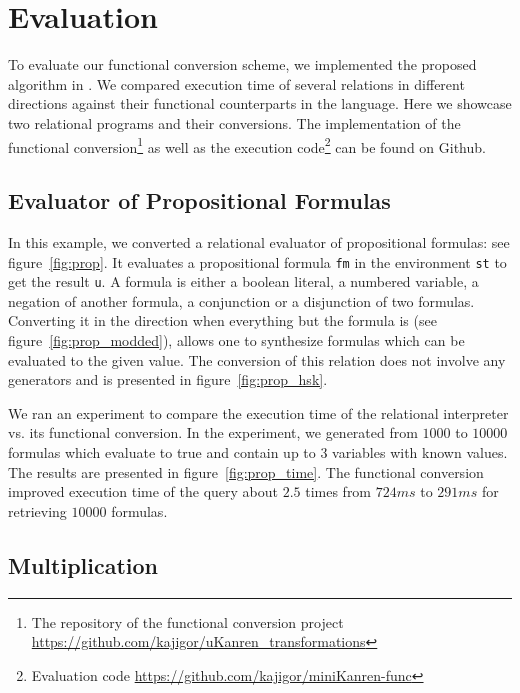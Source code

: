 \section{Evaluation}
\label{sec:evaluation}

To evaluate our functional conversion scheme, we implemented the proposed algorithm in \haskell.
We compared execution time of several \ocanren relations in different directions against their functional counterparts in the \ocaml language.
Here we showcase two relational programs and their conversions.
The implementation of the functional conversion\footnote{The repository of the functional conversion project \url{https://github.com/kajigor/uKanren_transformations}} as well as the execution code\footnote{Evaluation code \url{https://github.com/kajigor/miniKanren-func}} can be found on Github.



\subsection{Evaluator of Propositional Formulas}

In this example, we converted a relational evaluator of propositional formulas: see figure~\ref{fig:prop}.
It evaluates a propositional formula \lstinline{fm} in the environment \lstinline{st} to get the result \lstinline{u}.
A formula is either a boolean literal, a numbered variable, a negation of another formula, a conjunction or a disjunction of two formulas.
Converting it in the direction when everything but the formula is \inm (see figure~\ref{fig:prop_modded}), allows one to synthesize formulas which can be evaluated to the given value.
The conversion of this relation does not involve any generators and is presented in figure~\ref{fig:prop_hsk}.

We ran an experiment to compare the execution time of the relational interpreter vs. its functional conversion.
In the experiment, we generated from $1000$ to $10000$ formulas which evaluate to true and contain up to $3$ variables with known values.
The results are presented in figure~\ref{fig:prop_time}.
The functional conversion improved execution time of the query about $2.5$ times from $724ms$ to $291ms$ for retrieving $10000$ formulas.






\subsection{Multiplication}

